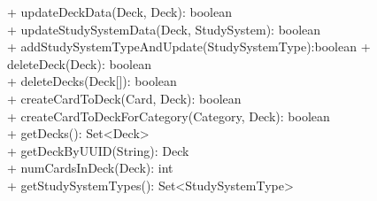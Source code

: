 {
    + updateDeckData(Deck, Deck): boolean \\
    + updateStudySystemData(Deck, StudySystem): boolean\\
    + addStudySystemTypeAndUpdate(StudySystemType):boolean
    + deleteDeck(Deck): boolean \\
    + deleteDecks(Deck[]): boolean \\
    + createCardToDeck(Card, Deck): boolean \\
    + createCardToDeckForCategory(Category, Deck): boolean \\
    + getDecks(): Set<Deck> \\
    + getDeckByUUID(String): Deck \\
    + numCardsInDeck(Deck): int\\
    + getStudySystemTypes(): Set<StudySystemType>
}{}
